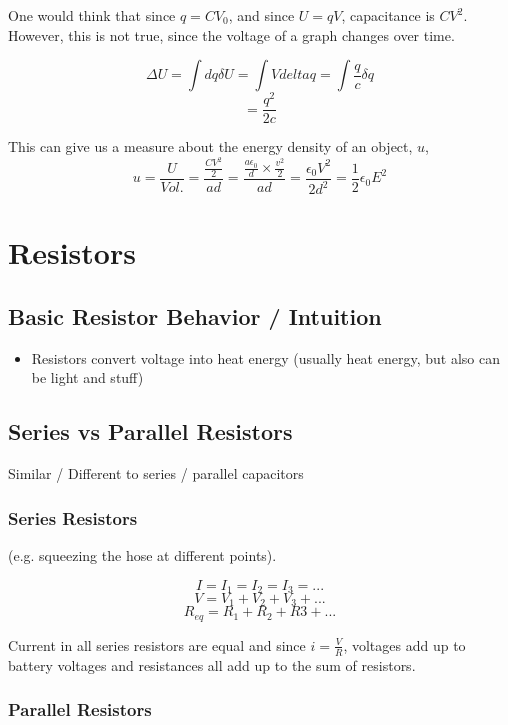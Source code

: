 \documentclass{article}
\begin{document}
One would think that since $q = CV_0$, and since $U = qV$, capacitance is $CV^2$. However, this is not true, since the voltage of a graph changes over time.

$$\Delta U = \int d q \delta U = \int V delta q  = \int \frac{q}{c} \delta q $$
$$ = \frac{q^2}{2c}$$

This can give us a measure about the energy density of an object, $u$,
$$u = \frac{U}{Vol.} = \frac{\frac{CV^2}{2}}{ad} = \frac{\frac{a \epsilon_0 }{d} \times \frac{v^2}{2}}{ad} = \frac{\epsilon_0 V^2}{2 d^2} = \frac{1}{2} \epsilon_0 E^2$$

\section{Resistors}

\subsection{Basic Resistor Behavior / Intuition}

\begin{itemize}
    \item Resistors convert voltage into heat energy (usually heat energy, but also can be light and stuff)
\end{itemize}

\subsection{Series vs Parallel Resistors}

Similar / Different to series / parallel capacitors

\subsubsection{Series Resistors}

(e.g. squeezing the hose at different points).

$$I = I_1 = I_2 = I_3 = ...$$
$$V = V_1 + V_2 + V_3 + ...$$
$$R_{eq} = R_1 + R_2 + R3 + ...$$

Current in all series resistors are equal and since $i = \frac{V}{R}$, voltages add up to battery voltages and resistances all add up to the sum of resistors.

\subsubsection{Parallel Resistors}
\end{document}
